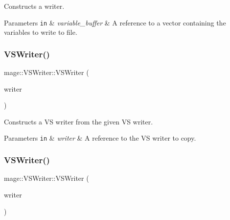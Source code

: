 Constructs a writer.


\begin{DoxyParams}[1]{Parameters}
\mbox{\tt in}  & {\em variable\+\_\+buffer} & A reference to a vector containing the variables to write to file. \\
\hline
\end{DoxyParams}
\hypertarget{classmage_1_1_v_s_writer_a77d146f812d9d37ee99c31133d3597b8}{}\label{classmage_1_1_v_s_writer_a77d146f812d9d37ee99c31133d3597b8} 
\subsubsection{\texorpdfstring{V\+S\+Writer()}{VSWriter()}\hspace{0.1cm}{\footnotesize\ttfamily [2/3]}}
{\footnotesize\ttfamily mage\+::\+V\+S\+Writer\+::\+V\+S\+Writer (\begin{DoxyParamCaption}\item[{const \hyperlink{classmage_1_1_v_s_writer}{V\+S\+Writer} \&}]{writer }\end{DoxyParamCaption})\hspace{0.3cm}{\ttfamily [delete]}}

Constructs a VS writer from the given VS writer.


\begin{DoxyParams}[1]{Parameters}
\mbox{\tt in}  & {\em writer} & A reference to the VS writer to copy. \\
\hline
\end{DoxyParams}
\hypertarget{classmage_1_1_v_s_writer_a744553658a13bbe59349058579fafb56}{}\label{classmage_1_1_v_s_writer_a744553658a13bbe59349058579fafb56} 
\subsubsection{\texorpdfstring{V\+S\+Writer()}{VSWriter()}\hspace{0.1cm}{\footnotesize\ttfamily [3/3]}}
{\footnotesize\ttfamily mage\+::\+V\+S\+Writer\+::\+V\+S\+Writer (\begin{DoxyParamCaption}\item[{\hyperlink{classmage_1_1_v_s_writer}{V\+S\+Writer} \&\&}]{writer }\end{DoxyParamCaption})\hspace{0.3cm}{\ttfamily [default]}}

